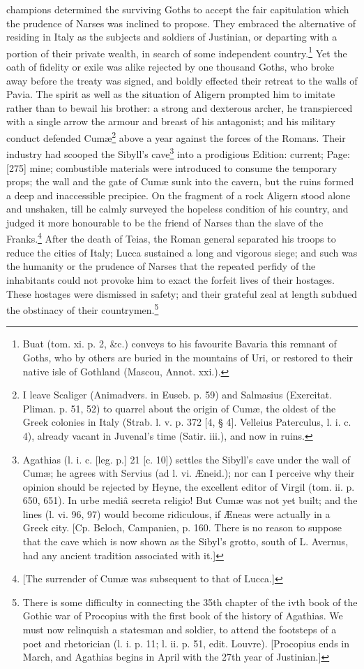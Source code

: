 champions determined the surviving Goths to accept the fair capitulation which the prudence of Narses was inclined to propose. They embraced the alternative of residing in Italy as the subjects and soldiers of Justinian, or departing with a portion of their private wealth, in search of some independent country.\footnote{Buat (tom. xi. p. 2, \&c.) conveys to his favourite Bavaria this remnant of Goths, who by others are buried in the mountains of Uri, or restored to their native isle of Gothland (Mascou, Annot. xxi.).} Yet the oath of fidelity or exile was alike rejected by one thousand Goths, who broke away before the treaty was signed, and boldly effected their retreat to the walls of Pavia. The spirit as well as the situation of Aligern prompted him to imitate rather than to bewail his brother: a strong and dexterous archer, he transpierced with a single arrow the armour and breast of his antagonist; and his military conduct defended Cumæ\footnote{I leave Scaliger (Animadvers. in Euseb. p. 59) and Salmasius (Exercitat. Pliman. p. 51, 52) to quarrel about the origin of Cumæ, the oldest of the Greek colonies in Italy (Strab. l. v. p. 372 [4, § 4]. Velleius Paterculus, l. i. c. 4), already vacant in Juvenal\texthebrew{}’s time (Satir. iii.), and now in ruins.} above a year against the forces of the Romans. Their industry had scooped the Sibyll\texthebrew{}’s cave\footnote{Agathias (l. i. c. [leg. p.] 21 [c. 10]) settles the Sibyll\texthebrew{}’s cave under the wall of Cumæ; he agrees with Servius (ad l. vi. Æneid.); nor can I perceive why their opinion should be rejected by Heyne, the excellent editor of Virgil (tom. ii. p. 650, 651). In urbe mediâ secreta religio! But Cumæ was not yet built; and the lines (l. vi. 96, 97) would become ridiculous, if Æneas were actually in a Greek city. [Cp. Beloch, Campanien, p. 160. There is no reason to suppose that the cave which is now shown as the Sibyl\texthebrew{}’s grotto, south of L. Avernus, had any ancient tradition associated with it.]} into a prodigious Edition: current; Page: [275] mine; combustible materials were introduced to consume the temporary props; the wall and the gate of Cumæ sunk into the cavern, but the ruins formed a deep and inaccessible precipice. On the fragment of a rock Aligern stood alone and unshaken, till he calmly surveyed the hopeless condition of his country, and judged it more honourable to be the friend of Narses than the slave of the Franks.\footnote{[The surrender of Cumæ was subsequent to that of Lucca.]} After the death of Teias, the Roman general separated his troops to reduce the cities of Italy; Lucca sustained a long and vigorous siege; and such was the humanity or the prudence of Narses that the repeated perfidy of the inhabitants could not provoke him to exact the forfeit lives of their hostages. These hostages were dismissed in safety; and their grateful zeal at length subdued the obstinacy of their countrymen.\footnote{There is some difficulty in connecting the 35th chapter of the ivth book of the Gothic war of Procopius with the first book of the history of Agathias. We must now relinquish a statesman and soldier, to attend the footsteps of a poet and rhetorician (l. i. p. 11; l. ii. p. 51, edit. Louvre). [Procopius ends in March, and Agathias begins in April with the 27th year of Justinian.]}

